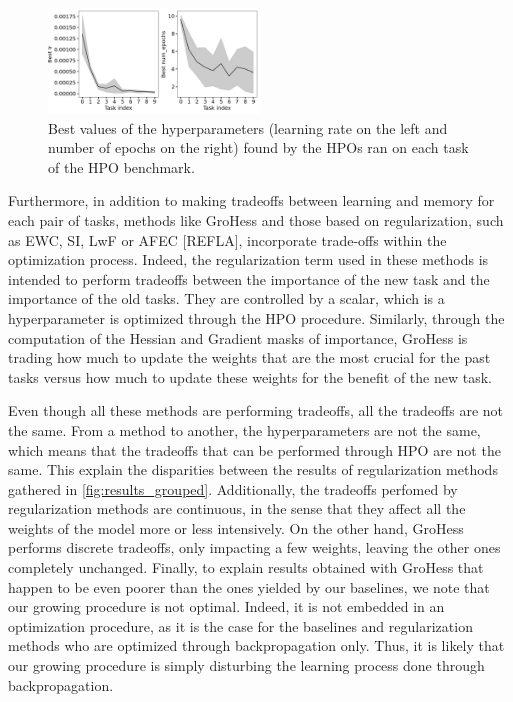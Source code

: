 \documentclass[11pt]{article}
\begin{document}
\begin{figure}
    \centering
    \includegraphics[width=0.5\textwidth]{images/best_params.png}
    \caption{Best values of the hyperparameters (learning rate on the left and number of epochs on the right) found by the HPOs ran on each task of the HPO benchmark.}
    \label{fig:best_params}
\end{figure}

\vspace{2mm}
\noindent
Furthermore, in addition to making tradeoffs between learning and memory for each pair of tasks, methods like GroHess and those based on regularization, such as EWC, SI, LwF or AFEC [REFLA], incorporate trade-offs within the optimization process. Indeed, the regularization term used in these methods is intended to perform tradeoffs between the importance of the new task and the importance of the old tasks. They are controlled by a scalar, which is a hyperparameter is optimized through the HPO procedure. Similarly, through the computation of the Hessian and Gradient masks of importance, GroHess is trading how much to update the weights that are the most crucial for the past tasks versus how much to update these weights for the benefit of the new task. 

\vspace{2mm}
\noindent
Even though all these methods are performing tradeoffs, all the tradeoffs are not the same. From a method to another, the hyperparameters are not the same, which means that the tradeoffs that can be performed through HPO are not the same. This explain the disparities between the results of regularization methods gathered in \ref{fig:results_grouped}. Additionally, the tradeoffs perfomed by regularization methods are continuous, in the sense that they affect all the weights of the model more or less intensively. On the other hand, GroHess performs discrete tradeoffs, only impacting a few weights, leaving the other ones completely unchanged. Finally, to explain results obtained with GroHess that happen to be even poorer than the ones yielded by our baselines, we note that our growing procedure is not optimal. Indeed, it is not embedded in an optimization procedure, as it is the case for the baselines and regularization methods who are optimized through backpropagation only. Thus, it is likely that our growing procedure is simply disturbing the learning process done through backpropagation.
\end{document}
